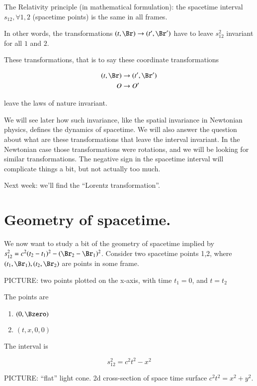 The Relativity principle (in mathematical formulation): the spacetime interval $s_{12}, \forall 1,2$ (spacetime points) is the same in all frames.

In other words, the transformations $(t, \Br) \rightarrow (t', \Br')$ have to leave $s_{12}^2$ invariant for all $1$ and $2$.

These transformations, that is to say these coordinate transformations 

\begin{align*}
(t, \Br) &\rightarrow (t', \Br') \\
O &\rightarrow O'
\end{align*}

leave the laws of nature invariant.

We will see later how such invariance, like the spatial invariance in Newtonian physics, defines the dynamics of spacetime.  We will also answer the question about what are these transformations that leave the interval invariant.  In the Newtonian case those transformations were rotations, and we will be looking for similar transformations.  The negative sign in the spacetime interval  will complicate things a bit, but not actually too much.

Next week: we'll find the ``Lorentz transformation''.

\section{Geometry of spacetime.}

We now want to study a bit of the geometry of spacetime implied by $s_{12}^2 = c^2(t_2 - t_1)^2 - (\Br_2 - \Br_1)^2$.  Consider two spacetime points 1,2, where $(t_1, \Br_1), (t_2, \Br_2)$ are points in some frame.

PICTURE: two points plotted on the x-axis, with time $t_1=0$, and $t = t_2$

The points are

\begin{enumerate}
\item $(0, \Bzero)$
\item $(t, x, 0, 0)$
\end{enumerate}

The interval is

\begin{equation}\label{eqn:relativisticElectrodynamicsL3:100}
s_{12}^2 = c^2 t^2 - x^2
\end{equation}

PICTURE: ``flat'' light cone.  2d cross-section of space time surface $c^2 t^2 = x^2 + y^2$.

